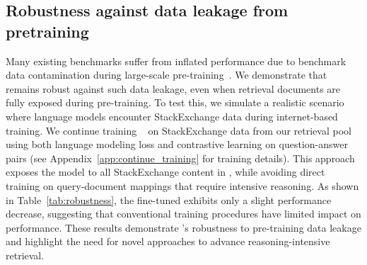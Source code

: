 \subsection{Robustness against data leakage from pretraining}
\label{sec:robustness}

Many existing benchmarks suffer from inflated performance due to benchmark data contamination during large-scale pre-training~\citep{zhou2023don,xu2024benchmarking}. We demonstrate that \ours remains robust against such data leakage, even when retrieval documents are fully exposed during pre-training. To test this, we simulate a realistic scenario where language models encounter StackExchange data during internet-based training. We continue training \grit~\citep{muennighoff2024generative} on StackExchange data from our retrieval pool using both language modeling loss and contrastive learning on question-answer pairs (see Appendix~\ref{app:continue_training} for training details). This approach exposes the model to all StackExchange content in \ours, while avoiding direct training on query-document mappings that require intensive reasoning. As shown in Table~\ref{tab:robustness}, the fine-tuned \grit exhibits only a slight performance decrease, suggesting that conventional training procedures have limited impact on \ours performance. These results demonstrate \ours's robustness to pre-training data leakage and highlight the need for novel approaches to advance reasoning-intensive retrieval.


